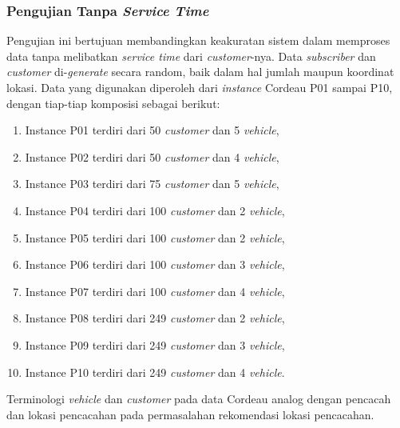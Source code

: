 \subsubsection{Pengujian Tanpa \textit{Service Time}}
\label{sssec:test-no-service-time}
Pengujian ini bertujuan membandingkan keakuratan sistem dalam memproses data tanpa melibatkan \textit{service time} dari \textit{customer}-nya. Data \textit{subscriber} dan \textit{customer} di-\textit{generate} secara random, baik dalam hal jumlah maupun koordinat lokasi. Data yang digunakan diperoleh dari \textit{instance} Cordeau P01 sampai P10, dengan tiap-tiap komposisi sebagai berikut:


\begin{enumerate}
	\item Instance P01 terdiri dari 50 \textit{customer} dan 5 \textit{vehicle},
	\item Instance P02 terdiri dari 50 \textit{customer} dan 4 \textit{vehicle}, 
	\item Instance P03 terdiri dari 75 \textit{customer} dan 5 \textit{vehicle}, 
	\item Instance P04 terdiri dari 100 \textit{customer} dan 2 \textit{vehicle}, 
	\item Instance P05 terdiri dari 100 \textit{customer} dan 2 \textit{vehicle}, 
	\item Instance P06 terdiri dari 100 \textit{customer} dan 3 \textit{vehicle}, 
	\item Instance P07 terdiri dari 100 \textit{customer} dan 4 \textit{vehicle}, 
	\item Instance P08 terdiri dari 249 \textit{customer} dan 2 \textit{vehicle}, 
	\item Instance P09 terdiri dari 249 \textit{customer} dan 3 \textit{vehicle}, 
	\item Instance P10 terdiri dari 249 \textit{customer} dan 4 \textit{vehicle}.
\end{enumerate}
Terminologi \textit{vehicle} dan \textit{customer} pada data Cordeau analog dengan pencacah dan lokasi pencacahan pada permasalahan rekomendasi lokasi pencacahan.


